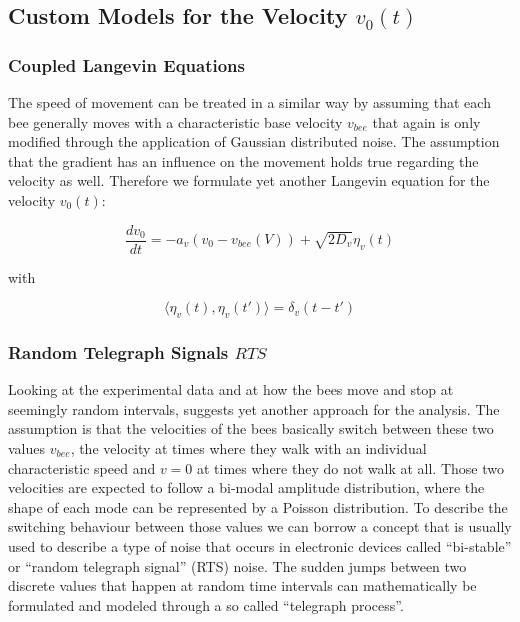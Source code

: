 \subsection{Custom Models for the Velocity $v_{0}(t)$}

\subsubsection{Coupled Langevin Equations}

The speed of movement can be treated in a similar way by assuming that each bee generally moves with a characteristic base velocity $v_{bee}$ that again is only modified through the application of Gaussian distributed noise. The assumption that the gradient has an influence on the movement holds true regarding the velocity as well. Therefore we formulate yet another Langevin equation for the velocity $v_{0}(t)$:

\begin{equation}
    \frac{dv_{0}}{dt} = - a_{v} (v_{0} - v_{bee}(V)) + \sqrt{2D_{v}}\eta_{v}(t)
\end{equation}

with

\begin{equation}
\label{eq:Langevin_vel}
    \langle \eta_{v}(t), \eta_{v}(t') \rangle = \delta_{v}(t - t')
\end{equation}

\subsubsection{Random Telegraph Signals $RTS$}

Looking at the experimental data and at how the bees move and stop at seemingly random intervals, suggests yet another approach for the analysis. The assumption is that the velocities of the bees basically switch between these two values $v_{bee}$, the velocity at times where they walk with an individual characteristic speed and $v = 0$ at times where they do not walk at all. 
Those two velocities are expected to follow a bi-modal amplitude distribution, where the shape of each mode can be represented by a Poisson distribution.  
To describe the switching behaviour between those values we can borrow a concept that is usually used to describe a type of noise that occurs in electronic devices \cite{Machlup1954} \cite{Puglisi2016} called ``bi-stable'' or ``random telegraph signal'' (RTS) noise. The sudden jumps between two discrete values that happen at random time intervals can mathematically be formulated and modeled through a so called ``telegraph process''. 

